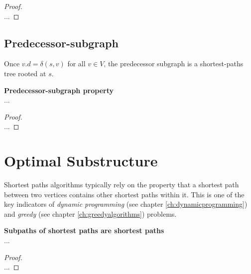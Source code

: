 \begin{proof} \textnormal{\cite[p.~673, thm. 24.15]{clrs}} \\
	...
\end{proof}

\subsection{Predecessor-subgraph}
Once $v.d = \delta(s, v)$ for all $v \in V$, the predecessor subgraph is a
shortest-paths tree rooted at $s$.
\begin{lemma}
	\textbf{Predecessor-subgraph property} \\
	...
\end{lemma}

\begin{proof} \textnormal{\cite[p.~676, thm. 24.17]{clrs}} \\
	...
\end{proof}

\newpage
\section{Optimal Substructure}
Shortest paths algorithms typically rely on the property that a shortest path
between two vertices contains other shortest paths within it. This is one of
the key indicators of \textit{dynamic programming} (see chapter
\ref{ch:dynamicprogramming}) and \textit{greedy} (see chapter
\ref{ch:greedyalgorithms}) problems.

\begin{lemma}
	\textbf{Subpaths of shortest paths are shortest paths} \\
	...
\end{lemma} 

\begin{proof} \textnormal{\cite[p.~645, thm.~24.1]{clrs}} \\
	...
\end{proof}


